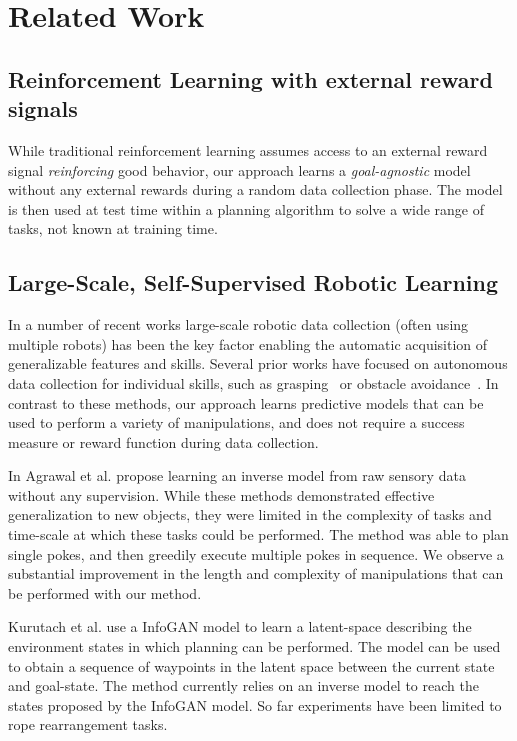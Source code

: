 \section{Related Work}\label{sec:rel_work}

\subsection{Reinforcement Learning with external reward signals}
While traditional reinforcement learning assumes access to an external reward signal \emph{reinforcing} good behavior, our approach learns a \emph{goal-agnostic} model without any external rewards during a random data collection phase. The model is then used at test time within a planning algorithm to solve a wide range of tasks, not known at training time.

\subsection{Large-Scale, Self-Supervised Robotic Learning}

In a number of recent works large-scale robotic data collection (often using multiple robots) has been the key factor enabling the automatic acquisition of generalizable features and skills. Several prior works have focused on autonomous data collection for individual skills, such as grasping~\cite{lerrel,google_handeye} or obstacle avoidance~\cite{greg_kahn_uncertainty,crashing}. In contrast to these methods, our approach learns predictive models that can be used to perform a variety of manipulations, and does not require a success measure or reward function during data collection. 

In \cite{pulkit} Agrawal et al. propose learning an inverse model from raw sensory data without any supervision. While these methods demonstrated effective generalization to new objects, they were limited in the complexity of tasks and time-scale at which these tasks could be performed. The method was able to plan single pokes, and then greedily execute multiple pokes in sequence. We observe a substantial improvement in the length and complexity of manipulations that can be performed with our method.

Kurutach et al. use a InfoGAN model \cite{kurutach2018learning} to learn a latent-space describing the environment states in which planning can be performed. The model can be used to obtain a sequence of waypoints in the latent space between the current state and goal-state. The method currently relies on an inverse model to reach the states proposed by the InfoGAN model. So far experiments have been limited to rope rearrangement tasks.

